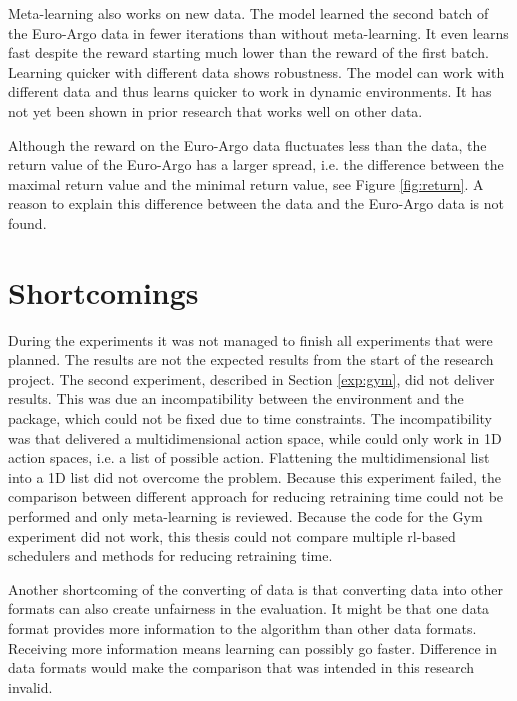 Meta-learning also works on new data. The model learned the second batch of
the Euro-Argo data in fewer iterations than without meta-learning. It even
learns fast despite the reward starting much lower than the reward of the
first batch. Learning quicker with different data shows robustness. The model
can work with different data and thus learns quicker to work in dynamic
environments. It has not yet been shown in prior research that \mrlco works
well on other data.

Although the reward on the Euro-Argo data fluctuates less than the \mrlco
data, the return value of the Euro-Argo has a larger spread, i.e. the
difference between the maximal return value and the minimal return value, see
Figure \ref{fig:return}. A reason to explain this difference between the
\mrlco data and the Euro-Argo data is not found.


\section{Shortcomings}

During the experiments it was not managed to finish all experiments that were
planned. The results are not the expected results from the start of the
research project. The second experiment, described in Section \ref{exp:gym},
did not deliver results. This was due an incompatibility between the
 environment and the  package, which could not be
fixed due to time constraints. The incompatibility was that 
delivered a multidimensional action space, while  could only
work in 1D action spaces, i.e. a list of possible action. Flattening the
multidimensional list into a 1D list did not overcome the problem. Because
this experiment failed, the comparison between different approach for reducing
retraining time could not be performed and only meta-learning is reviewed.
Because the code for the Gym experiment did not work, this thesis could not
compare multiple \gls{rl}-based schedulers and methods for reducing retraining time.

Another shortcoming of the converting of data is that converting data into
other formats can also create unfairness in the evaluation. It might be that
one data format provides more information to the algorithm than other data
formats. Receiving more information means learning can possibly go faster.
Difference in data formats would make the comparison that was intended in this
research invalid.
